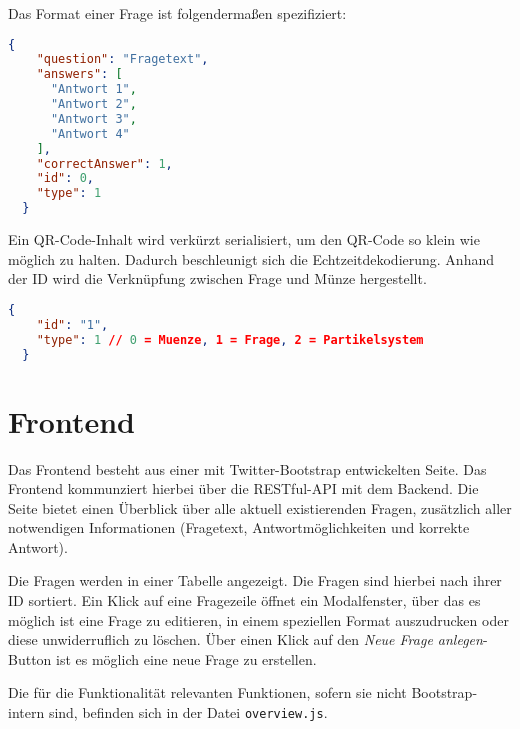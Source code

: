 Das Format einer Frage ist folgendermaßen spezifiziert:
\begin{lstlisting}[language=JSON]
  {
    "question": "Fragetext",
    "answers": [
      "Antwort 1",
      "Antwort 2",
      "Antwort 3",
      "Antwort 4"
    ],
    "correctAnswer": 1,
    "id": 0,
    "type": 1
  }
\end{lstlisting}

Ein QR-Code-Inhalt wird verkürzt serialisiert, um den QR-Code so klein wie möglich zu halten. Dadurch beschleunigt sich die Echtzeitdekodierung. Anhand der ID wird die Verknüpfung zwischen Frage und Münze hergestellt.
\begin{lstlisting}[language=JSON]
  {
    "id": "1",
    "type": 1 // 0 = Muenze, 1 = Frage, 2 = Partikelsystem
  }
\end{lstlisting}

\section{Frontend}
Das Frontend besteht aus einer mit Twitter-Bootstrap entwickelten Seite. Das Frontend kommunziert hierbei über die RESTful-API mit dem Backend. Die Seite bietet einen Überblick über alle aktuell existierenden Fragen, zusätzlich aller notwendigen Informationen (Fragetext, Antwortmöglichkeiten und korrekte Antwort).

Die Fragen werden in einer Tabelle angezeigt. Die Fragen sind hierbei nach ihrer ID sortiert. Ein Klick auf eine Fragezeile öffnet ein Modalfenster, über das es möglich ist eine Frage zu editieren, in einem speziellen Format auszudrucken oder diese unwiderruflich zu löschen. Über einen Klick auf den \emph{Neue Frage anlegen}-Button ist es möglich eine neue Frage zu erstellen.

Die für die Funktionalität relevanten Funktionen, sofern sie nicht Bootstrap-intern sind, befinden sich in der Datei \texttt{overview.js}.
